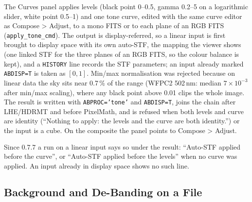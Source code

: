 \documentclass[11pt,a4paper]{article}
\newcommand{\code}[1]{\texttt{\small #1}}
\begin{document}
    The Curves panel applies levels (black point 0--0.5, gamma 0.2--5 on a logarithmic slider, white point 0.5--1) and one tone curve, edited with the same curve editor as Compose \textgreater{} Adjust, to a mono FITS or to each plane of an RGB FITS (\code{apply\_tone\_cmd}). The output is display-referred, so a linear input is first brought to display space with its own auto-STF, the mapping the viewer shows (one linked STF for the three planes of an RGB FITS, so the colour balance is kept), and a \code{HISTORY} line records the STF parameters; an input already marked \code{ABDISP=T} is taken as $[0, 1]$. Min/max normalisation was rejected because on linear data the sky sits near 0.7\,\% of the range (WFPC2 502\,nm: median $7 \times 10^{-3}$ after min/max scaling), where any black point above 0.01 clips the whole image. The result is written with \code{ABPROC='tone'} and \code{ABDISP=T}, joins the chain after LHE/HDRMT and before PixelMath, and is refused when both levels and curve are identity (``Nothing to apply: the levels and the curve are both identity.'') or the input is a cube. On the composite the panel points to Compose \textgreater{} Adjust.

    Since 0.7.7 a run on a linear input says so under the result: ``Auto-STF applied before the curve'', or ``Auto-STF applied before the levels'' when no curve was applied. An input already in display space shows no such line.

    \subsection{Background and De-Banding on a File}
\end{document}

